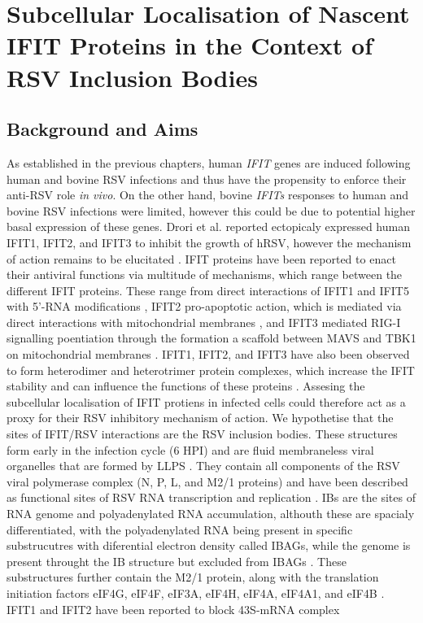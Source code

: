 \chapter{Subcellular Localisation of Nascent IFIT Proteins in the Context of RSV Inclusion Bodies} \label{ch:Subcellular Localisation of Nascent IFIT Proteins in the Context of RSV Inclusion Bodies}
\section{Background and Aims} \label{sec:Background and Aims-Chapter3}
As established in the previous chapters, human \textit{IFIT} genes are induced following human and bovine RSV infections and thus have the propensity to enforce their anti-RSV role \textit{in vivo}. On the other hand, bovine \textit{IFITs} responses to human and bovine RSV infections were limited, however this could be due to potential higher basal expression of these genes. Drori et al. reported ectopicaly expressed human IFIT1, IFIT2, and IFIT3 to inhibit the growth of hRSV, however the mechanism of action remains to be elucitated \cite{Drori2020InfluenzaProteins}. IFIT proteins have been reported to enact their antiviral functions via multitude of mechanisms, which range between the different IFIT proteins. These range from direct interactions of IFIT1 and IFIT5 with 5'-RNA modifications \cite{Abbas2013StructuralProteins, Diamond2014IFIT1:Translation}, IFIT2 pro-apoptotic action, which is mediated via direct interactions with mitochondrial membranes \cite{Chen2017InhibitionApoptosis}, and IFIT3 mediated RIG-I signalling poentiation through the formation a scaffold between MAVS and TBK1 on mitochondrial membranes \cite{Liu2011IFN-InducedTBK1}. IFIT1, IFIT2, and IFIT3 have also been observed to form heterodimer and heterotrimer protein complexes, which increase the IFIT stability and can influence the functions of these proteins \cite{Mears2018BetterResponse}. Assesing the subcellular localisation of IFIT protiens in infected cells could therefore act as a proxy for their RSV inhibitory mechanism of action. We hypothetise that the sites of IFIT/RSV interactions are the RSV inclusion bodies. These structures form early in the infection cycle (6 HPI) and are fluid membraneless viral organelles that are formed by LLPS \cite{Rincheval2017FunctionalVirus}. They contain all components of the RSV viral polymerase complex (N, P, L, and M2/1 proteins) and have been described as functional sites of RSV RNA transcription and replication \cite{Weber1995NonstructuralSerum, Fricke2013P38Assembly, Rincheval2017FunctionalVirus, Jobe2021BovineResponses}. IBs are the sites of RNA genome and polyadenylated RNA accumulation, althouth these are spacialy differentiated, with the polyadenylated RNA being present in specific substrucutres with diferential electron density called IBAGs, while the genome is present throught the IB structure but excluded from IBAGs \cite{Rincheval2017FunctionalVirus}. These substructures further contain the M2/1 protein, along with the translation initiation factors eIF4G, eIF4F, eIF3A, eIF4H, eIF4A, eIF4A1, and eIF4B \cite{Rincheval2017FunctionalVirus, Jobe2023ViralCondensates}. IFIT1 and IFIT2 have been reported to block 43S-mRNA complex 